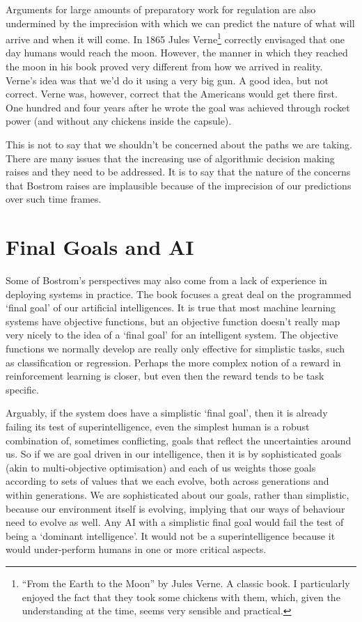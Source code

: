 \documentclass[a4paper]{caesar_book}
\begin{document}
Arguments for large amounts of preparatory work for regulation are also undermined by the imprecision with which we can predict the nature of what will arrive and when it will come. In 1865 Jules Verne\footnote{``From the Earth to the Moon'' by Jules Verne. A classic book. I particularly enjoyed the fact that they took some chickens with them, which, given the understanding at the time, seems very sensible and practical.} correctly envisaged that one day humans would reach the moon. However, the manner in which they reached the moon in his book proved very different from how we arrived in reality. Verne’s idea was that we’d do it using a very big gun. A good idea, but not correct. Verne was, however, correct that the Americans would get there first. One hundred and four years after he wrote the goal was achieved through rocket power (and without any chickens inside the capsule).

This is not to say that we shouldn’t be concerned about the paths we are taking. There are many issues that the increasing use of algorithmic decision making raises and they need to be addressed. It is to say that the nature of the concerns that Bostrom raises are implausible because of the imprecision of our predictions over such time frames.

\section{Final Goals and AI}

Some of Bostrom’s perspectives may also come from a lack of experience in deploying systems in practice. The book focuses a great deal on the programmed ‘final goal’ of our artificial intelligences. It is true that most machine learning systems have objective functions, but an objective function doesn’t really map very nicely to the idea of a ‘final goal’ for an intelligent system. The objective functions we normally develop are really only effective for simplistic tasks, such as classification or regression. Perhaps the more complex notion of a reward in reinforcement learning is closer, but even then the reward tends to be task specific.

Arguably, if the system does have a simplistic ‘final goal’, then it is already failing its test of superintelligence, even the simplest human is a robust combination of, sometimes conflicting, goals that reflect the uncertainties around us. So if we are goal driven in our intelligence, then it is by sophisticated goals (akin to multi-objective optimisation) and each of us weights those goals according to sets of values that we each evolve, both across generations and within generations. We are sophisticated about our goals, rather than simplistic, because our environment itself is evolving, implying that our ways of behaviour need to evolve as well. Any AI with a simplistic final goal would fail the test of being a ‘dominant intelligence’. It would not be a superintelligence because it would under-perform humans in one or more critical aspects.
\end{document}
